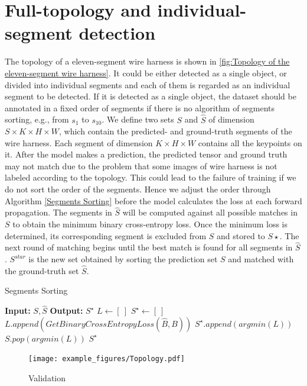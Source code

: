 \section{Full-topology and individual-segment detection}
 The topology of a eleven-segment wire harness is shown in \autoref{fig:Topology of the eleven-segment wire harness}. It could be either detected as a single
 object, or divided into individual segments and each of them is regarded as an individual segment to be detected. If it is detected as a single object, 
 the dataset should be annotated in a fixed order of segments if there is no algorithm of segments sorting, e.g., from $s_1$ to $s_10$. 
 We define two sets $S$ and $\hat{S}$ of dimension $S \times K \times H \times W$, which contain the predicted- and ground-truth segments of the wire harness. 
 Each segment of dimension $K\times H\times W$ contains all the keypoints on it. After the model makes a prediction, the predicted tensor and ground truth may 
 not match due to the problem that some images of wire harness is not labeled according to the topology. This could lead to the failure of training if we do not 
 sort the order of the segments. Hence we adjust the order through Algorithm \ref{Segments Sorting} before the model calculates the loss at each forward propagation. 
 The segments in $\hat{S}$ will be computed against all possible matches in $S$ to obtain the minimum binary cross-entropy loss. Once the minimum loss is determined, 
 its corresponding segment is excluded from $S$ and stored to $S\star$. The next round of matching begins until the best match is found for all segments in $\hat{S}$. 
 $S^{star}$ is the new set obtained by sorting the prediction set $S$ and matched with the ground-truth set $\hat{S}$.
 \begin{algorithm} 
  \caption{Segments Sorting}
  \label{Segments Sorting}
  \begin{algorithmic}
  \STATE \textbf{Input:} $S, \hat{S}$
  \STATE \textbf{Output:} $S^{\star}$
  \STATE $ L\leftarrow \left [\ \right ] $
  \STATE $ S^{\star}\leftarrow \left [\ \right ] $
          \STATE $L.append(GetBinaryCrossEntropyLoss(\hat{B},B))$
      \ENDFOR
      \STATE $S^{\star}.append({argmin(L)})$
      \STATE $S.pop({argmin(L)})$
  \ENDFOR
  \RETURN $S^{\star}$
  \end{algorithmic}
\end{algorithm}

 \begin{figure}[!htbp]
  \centering
  \texttt{[image: example\_figures/Topology.pdf]}
  \caption{Validation}
  \label{fig:Topology of the eleven-segment wire harness}
\end{figure}
